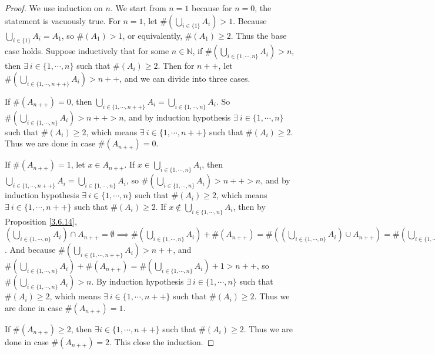 \begin{proof}
We use induction on \(n\).
We start from \(n = 1\) because for \(n = 0\), the statement is vacuously true.
For \(n = 1\), let \(\#(\bigcup_{i \in \{1\}} A_i) > 1\).
Because \(\bigcup_{i \in \{1\}} A_i = A_1\), so \(\#(A_1) > 1\), or equivalently, \(\#(A_1) \geq 2\).
Thus the base case holds.
Suppose inductively that for some \(n \in \mathds{N}\), if \(\#(\bigcup_{i \in \{1, \cdots, n\}} A_i) > n\), then \(\exists\ i \in \{1, \cdots, n\}\) such that \(\#(A_i) \geq 2\).
Then for \(n++\), let \(\#(\bigcup_{i \in \{1, \cdots, n++\}} A_i) > n++\), and we can divide into three cases.

If \(\#(A_{n++}) = 0\), then \(\bigcup_{i \in \{1, \cdots, n++\}} A_i = \bigcup_{i \in \{1, \cdots, n\}} A_i\).
So \(\#(\bigcup_{i \in \{1, \cdots, n\}} A_i) > n++ > n\), and by induction hypothesis \(\exists\ i \in \{1, \cdots, n\}\) such that \(\#(A_i) \geq 2\), which means \(\exists\ i \in \{1, \cdots, n++\}\) such that \(\#(A_i) \geq 2\).
Thus we are done in case \(\#(A_{n++}) = 0\).

If \(\#(A_{n++}) = 1\), let \(x \in A_{n++}\).
If \(x \in \bigcup_{i \in \{1, \cdots, n\}} A_i\), then \(\bigcup_{i \in \{1, \cdots, n++\}} A_i = \bigcup_{i \in \{1, \cdots, n\}} A_i\), so \(\#(\bigcup_{i \in \{1, \cdots, n\}} A_i) > n++ > n\), and by induction hypothesis \(\exists\ i \in \{1, \cdots, n\}\) such that \(\#(A_i) \geq 2\), which means \(\exists\ i \in \{1, \cdots, n++\}\) such that \(\#(A_i) \geq 2\).
If \(x \notin \bigcup_{i \in \{1, \cdots, n\}} A_i\), then by Proposition \ref{3.6.14}, \((\bigcup_{i \in \{1, \cdots, n\}} A_i) \cap A_{n++} = \emptyset \implies \#(\bigcup_{i \in \{1, \cdots, n\}} A_i) + \#(A_{n++}) = \#((\bigcup_{i \in \{1, \cdots, n\}} A_i) \cup A_{n++}) = \#(\bigcup_{i \in \{1, \cdots, n++\}} A_i)\).
And because \(\#(\bigcup_{i \in \{1, \cdots, n++\}} A_i) > n++\), and \(\#(\bigcup_{i \in \{1, \cdots, n\}} A_i) + \#(A_{n++}) = \#(\bigcup_{i \in \{1, \cdots, n\}} A_i) + 1 > n++\), so \(\#(\bigcup_{i \in \{1, \cdots, n\}} A_i) > n\).
By induction hypothesis \(\exists\ i \in \{1, \cdots, n\}\) such that \(\#(A_i) \geq 2\), which means \(\exists\ i \in \{1, \cdots, n++\}\) such that \(\#(A_i) \geq 2\).
Thus we are done in case \(\#(A_{n++}) = 1\).

If \(\#(A_{n++}) \geq 2\), then \(\exists i \in \{1, \cdots, n++\}\) such that \(\#(A_i) \geq 2\).
Thus we are done in case \(\#(A_{n++}) = 2\).
This close the induction.
\end{proof}